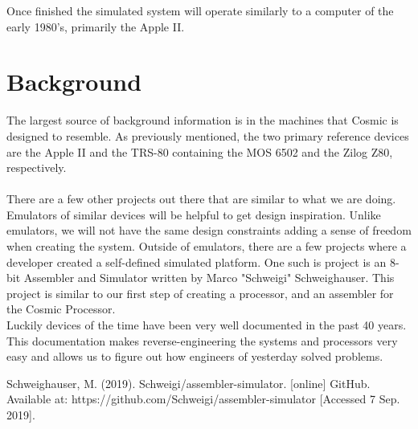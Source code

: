 \documentclass[conference]{IEEEtran}
\begin{document}
Once finished the simulated system will operate similarly to a computer of the early 1980's, primarily the Apple II. 

\section{Background}

The largest source of background information is in the machines that Cosmic is designed to resemble. As previously mentioned, the two primary reference devices are the Apple II and the TRS-80 containing the MOS 6502 and the Zilog Z80, respectively. \\\\ There are a few other projects out there that are similar to what we are doing. Emulators of similar devices will be helpful to get design inspiration. Unlike emulators, we will not have the same design constraints adding a sense of freedom when creating the system.  Outside of emulators, there are a few projects where a developer created a self-defined simulated platform. One such is project is an 8-bit Assembler and Simulator written by Marco "Schweigi" Schweighauser\cite{b1}. This project is similar to our first step of creating a processor, and an assembler for the Cosmic Processor.\\

    Luckily devices of the time have been very well documented in the past 40 years. This documentation makes
reverse-engineering the systems and processors very easy and allows us to figure out how
engineers of yesterday solved problems. 


\begin{thebibliography}{00}
 Schweighauser, M. (2019). Schweigi/assembler-simulator. [online] GitHub. Available at: https://github.com/Schweigi/assembler-simulator [Accessed 7 Sep. 2019].

\end{thebibliography}
\end{document}
